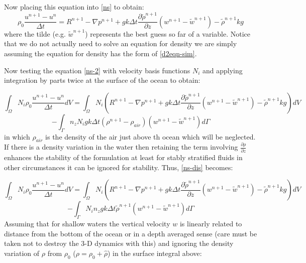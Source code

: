 Now placing this equation into \ref{ns} to obtain:
\begin{equation}
\rho_0 \frac{u^{n+1}- u^n}{\Delta t}= R^{n+1} - \nabla p^{n+1}
+ g k \Delta t \frac{\partial {\tilde \rho}^{n+1}}{\partial z} (w^{n+1}- {\tilde w}^{n+1})
- {\tilde \rho}^{n+1} k g
\label{ns-2}
\end{equation}
where the tilde (e.g. ${\tilde w}^{n+1}$) represents the best guess so far of a variable.
Notice that we do not actually need to solve an equation for density we are
simply assuming the equation for density has the form of \ref{d2eqn-sim}.

Now testing the equation \ref{ns-2} with velocity basis functions
$N_i$ and applying integration by parts twice at the surface
of the ocean to obtain:

\begin{equation}
\int_\Omega N_i \rho_0 \frac{u^{n+1}- u^n}{\Delta t} d V=
\int_\Omega N_i (R^{n+1} - \nabla p^{n+1}
+ g k \Delta t \frac{\partial {\tilde \rho}^{n+1}}{\partial z} (w^{n+1}- {\tilde w}^{n+1})
- {\tilde \rho}^{n+1} k g ) dV
\end{equation}
\begin{equation}
- \int_\Gamma n_z N_i g k \Delta t (\rho^{n+1}-\rho_{air})(w^{n+1}-\tilde
w^{n+1}) d\Gamma
\label{ns-dis-b}
\end{equation}
in which $\rho_{air}$ is the density of the air just above th ocean
which will be neglected. If there is a density variation in the water
then retaining the term involving $\frac{\partial \rho}{\partial z}$
enhances the stability of the formulation at least for stably stratified
fluids in other circumstances it can be ignored for stability.
Thus, \ref{ns-dis} becomes:

\begin{equation}
\int_\Omega N_i \rho_0 \frac{u^{n+1}- u^n}{\Delta t} d V=
\int_\Omega N_i (R^{n+1} - \nabla p^{n+1}
+ g k \Delta t \frac{\partial {\tilde \rho}^{n+1}}{\partial z} (w^{n+1}- {\tilde w}^{n+1})
- {\tilde \rho}^{n+1} k g ) dV
\end{equation}
\begin{equation}
- \int_\Gamma N_i n_z g k \Delta t {\tilde \rho}^{n+1}(w^{n+1}-\tilde
w^{n+1}) d\Gamma
\label{ns-dis-2-b}
\end{equation}
Assuming that for shallow waters the vertical velocity $w$
is linearly related to distance from the bottom of the ocean
or in a depth averaged sense (care must be taken not to destroy the
3-D dynamics with this) and ignoring the density variation of $\rho$
from $\rho_0$ ($\rho=\rho_0+\hat \rho$) in the surface integral above:

